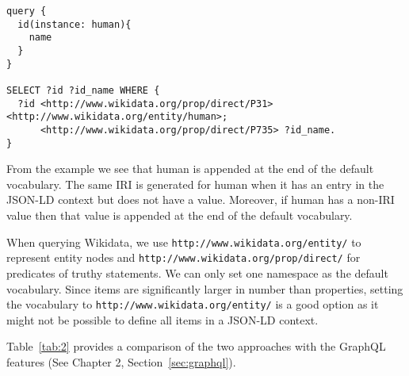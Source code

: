 \begin{minipage}{\linewidth}
\begin{lstlisting}[label=lst:53, caption={GraphQL query and generated SPARQL query in GraphQL-LD}, language=SPARQL]
query {
  id(instance: human){
    name
  }
}

SELECT ?id ?id_name WHERE {
  ?id <http://www.wikidata.org/prop/direct/P31> <http://www.wikidata.org/entity/human>;
      <http://www.wikidata.org/prop/direct/P735> ?id_name.
}
\end{lstlisting}
\end{minipage}


From the example we see that human is appended at the end of the default vocabulary. The same IRI is generated for human when it has an entry in the JSON-LD context but does not have a value. Moreover, if human has a non-IRI value then that value is appended at the end of the default vocabulary. 

When querying Wikidata, we use \texttt{http://www.wikidata.org/entity/} to represent entity nodes and \texttt{http://www.wikidata.org/prop/direct/} for predicates of truthy statements. We can only set one namespace as the default vocabulary. Since items are significantly larger in number than properties, setting the vocabulary to \texttt{http://www.wikidata.org/entity/} is a good option as it might not be possible to define all items in a JSON-LD context.



Table~\ref{tab:2} provides a comparison of the two approaches with the GraphQL features (See Chapter 2, Section~\ref{sec:graphql}).


